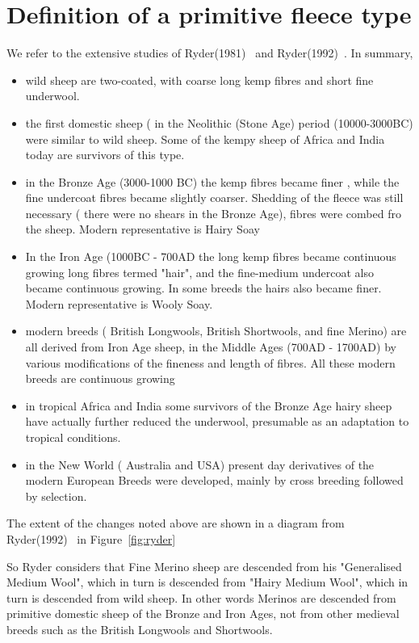 \documentclass[titlepage]{article}  %
\begin{document}
\section{Definition of a primitive fleece type}
We refer to the extensive studies of Ryder(1981)~\cite{ryde:81} and Ryder(1992)~\cite{ryde:92}. In summary,
\begin{itemize}
\item wild sheep are two-coated, with coarse long kemp fibres and short fine underwool. 
\item the first domestic sheep ( in the Neolithic (Stone Age) period (10000-3000BC) were similar to wild sheep. Some of the kempy sheep of Africa and India today are survivors of this type.
\item in the Bronze Age (3000-1000 BC) the kemp fibres became finer , while the fine undercoat fibres became slightly coarser. Shedding of the fleece was still necessary ( there were no shears in the Bronze Age), fibres were combed fro the sheep. Modern representative is Hairy Soay
\item  In the Iron Age (1000BC - 700AD  the long kemp fibres became continuous growing long fibres termed "hair", and the fine-medium undercoat also became continuous growing. In some breeds the hairs also became finer. Modern representative is Wooly Soay.
\item modern breeds ( British Longwools, British Shortwools, and fine Merino) are all derived from Iron Age sheep, in the Middle Ages (700AD - 1700AD) by various modifications of the fineness and length of fibres.  All  these modern breeds are continuous growing
\item in tropical Africa and India some survivors of the Bronze Age hairy sheep have actually further reduced the underwool, presumable as an adaptation to tropical conditions.
\item in the New World ( Australia and USA) present day derivatives of the modern European Breeds were developed, mainly by cross breeding followed by selection.
\end{itemize}
The extent of the changes  noted above are shown in a diagram from Ryder(1992)~\cite{ryde:92} in Figure~\ref{fig:ryder}


So Ryder considers that Fine Merino sheep are descended from his "Generalised Medium Wool", which in turn is descended from "Hairy Medium Wool", which in turn is descended from wild sheep. In other words Merinos are descended from primitive domestic sheep of the Bronze and Iron Ages, not from other medieval breeds such as the British Longwools and Shortwools.
\end{document}
